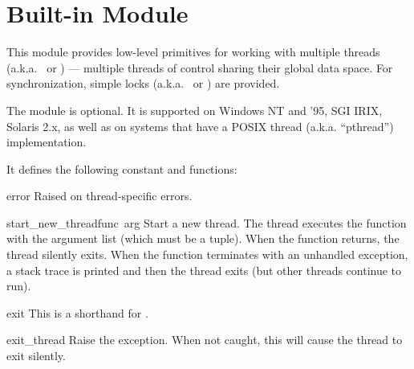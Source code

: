 \section{Built-in Module }
\label{module-thread}

This module provides low-level primitives for working with multiple
threads (a.k.a.\  or ) --- multiple
threads of control sharing their global data space.  For
synchronization, simple locks (a.k.a.\  or ) are provided.

The module is optional.  It is supported on Windows NT and '95, SGI
IRIX, Solaris 2.x, as well as on systems that have a POSIX thread
(a.k.a. ``pthread'') implementation.

It defines the following constant and functions:

\renewcommand{\indexsubitem}{(in module thread)}
\begin{excdesc}{error}
Raised on thread-specific errors.
\end{excdesc}

\begin{funcdesc}{start_new_thread}{func\, arg}
Start a new thread.  The thread executes the function 
with the argument list  (which must be a tuple).  When the
function returns, the thread silently exits.  When the function
terminates with an unhandled exception, a stack trace is printed and
then the thread exits (but other threads continue to run).
\end{funcdesc}

\begin{funcdesc}{exit}{}
This is a shorthand for .
\end{funcdesc}

\begin{funcdesc}{exit_thread}{}
Raise the  exception.  When not caught, this will
cause the thread to exit silently.
\end{funcdesc}


